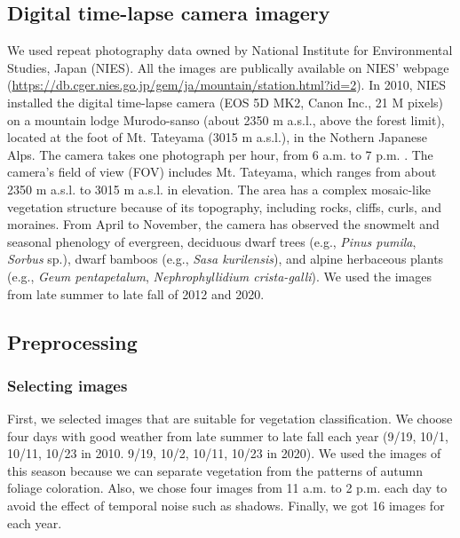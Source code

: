\documentclass{article}
\begin{document}
\hypertarget{digital-time-lapse-camera-imagery}{%
\subsection{Digital time-lapse camera imagery}\label{digital-time-lapse-camera-imagery}}

We used repeat photography data owned by National Institute for Environmental Studies, Japan (NIES). All the images are publically available on NIES' webpage (\url{https://db.cger.nies.go.jp/gem/ja/mountain/station.html?id=2}). In 2010, NIES installed the digital time-lapse camera (EOS 5D MK2, Canon Inc., 21 M pixels) on a mountain lodge Murodo-sanso (about 2350 m a.s.l., above the forest limit), located at the foot of Mt. Tateyama (3015 m a.s.l.), in the Nothern Japanese Alps. The camera takes one photograph per hour, from 6 a.m. to 7 p.m. . The camera's field of view (FOV) includes Mt. Tateyama, which ranges from about 2350 m a.s.l. to 3015 m a.s.l. in elevation. The area has a complex mosaic-like vegetation structure because of its topography, including rocks, cliffs, curls, and moraines. From April to November, the camera has observed the snowmelt and seasonal phenology of evergreen, deciduous dwarf trees (e.g., \emph{Pinus pumila}, \emph{Sorbus} sp.), dwarf bamboos (e.g., \emph{Sasa kurilensis}), and alpine herbaceous plants (e.g., \emph{Geum pentapetalum}, \emph{Nephrophyllidium crista-galli}). We used the images from late summer to late fall of 2012 and 2020.

\hypertarget{preprocessing}{%
\subsection{Preprocessing}\label{preprocessing}}

\hypertarget{selecting-images}{%
\subsubsection{Selecting images}\label{selecting-images}}

First, we selected images that are suitable for vegetation classification. We choose four days with good weather from late summer to late fall each year (9/19, 10/1, 10/11, 10/23 in 2010. 9/19, 10/2, 10/11, 10/23 in 2020). We used the images of this season because we can separate vegetation from the patterns of autumn foliage coloration. Also, we chose four images from 11 a.m. to 2 p.m. each day to avoid the effect of temporal noise such as shadows. Finally, we got 16 images for each year.
\end{document}
